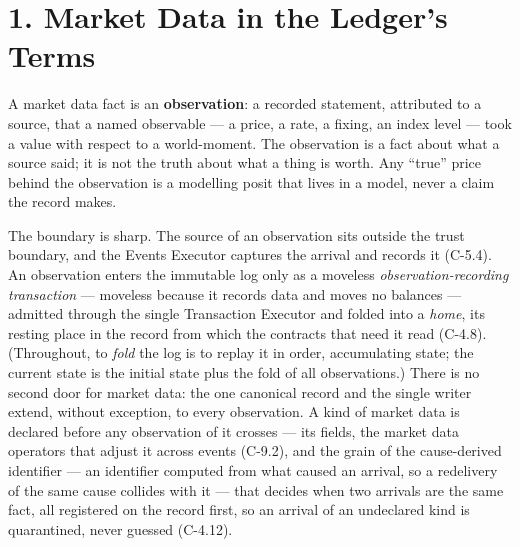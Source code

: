 \documentclass[11pt,a4paper]{article}
\begin{document}
\section{1. Market Data in the Ledger's Terms}

A market data fact is an \textbf{observation}: a recorded statement,
attributed to a source, that a named observable --- a price, a rate, a
fixing, an index level --- took a value with respect to a world-moment.
The observation is a fact about what a source said; it is not the truth
about what a thing is worth. Any ``true'' price behind the observation is
a modelling posit that lives in a model, never a claim the record makes.

The boundary is sharp. The source of an observation sits outside the
trust boundary, and the Events Executor captures the arrival and records
it (C-5.4). An observation enters the immutable log only as a moveless
\emph{observation-recording transaction} --- moveless because it records
data and moves no balances --- admitted through the single Transaction
Executor and folded into a \emph{home}, its resting place in the record
from which the contracts that need it read (C-4.8). (Throughout, to
\emph{fold} the log is to replay it in order, accumulating state; the
current state is the initial state plus the fold of all observations.)
There is no second door for market data: the one canonical record and the
single writer extend, without exception, to every observation. A kind of
market data is declared before any observation of it crosses --- its
fields, the market data operators that adjust it across events (C-9.2),
and the grain of the cause-derived identifier --- an identifier computed
from what caused an arrival, so a redelivery of the same cause collides
with it --- that decides when two arrivals are the same fact, all
registered on the record first, so an arrival of an undeclared kind is
quarantined, never guessed (C-4.12).
\end{document}
